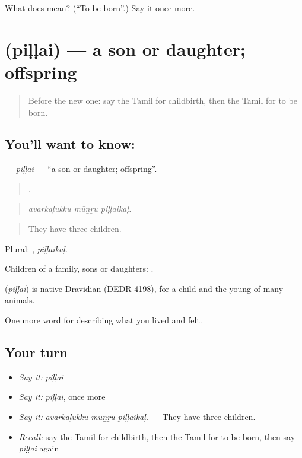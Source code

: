 \begin{tcolorbox}[breakable,colback=teal!4,colframe=teal!35!black,title={Before you move on}]
What does  mean? (\textquotedblleft{}To be born\textquotedblright{}.) Say it once more.
\end{tcolorbox}
\section[\texorpdfstring{\ta{பிள்ளை} (piḷḷai)}{பிள்ளை (piḷḷai)}]{ (piḷḷai) — a son or daughter; offspring}

\label{lesson:TA-C496-pillai}



\begin{quote}
Before the new one: say the Tamil for childbirth, then the Tamil for to be born.
\end{quote}

\subsection*{You'll want to know: }
\textbf{} — \emph{piḷḷai} — \textquotedblleft{}a son or daughter; offspring\textquotedblright{}.

\begin{quote}
  .
\end{quote}

\begin{quote}
\emph{avarkaḷukku mūṉṟu piḷḷaikaḷ.}
\end{quote}

\begin{quote}
They have three children.
\end{quote}

Plural: , \emph{piḷḷaikaḷ}.

Children of a family, sons or daughters: .

\begin{cousinweb}
\textbf{} (\emph{piḷḷai}) is native Dravidian (DEDR 4198), for a child and the young of many animals.
\end{cousinweb}

\begin{grammarlens}[title={What you've built}]
One more word for describing what you lived and felt.
\end{grammarlens}

\subsection*{Your turn}
\begin{itemize}
\raggedright
  \item \emph{Say it:} \emph{piḷḷai}
  \item \emph{Say it:} \emph{piḷḷai}, once more
  \item \emph{Say it:} \emph{avarkaḷukku mūṉṟu piḷḷaikaḷ.} — They have three children.
  \item \emph{Recall:} say the Tamil for childbirth, then the Tamil for to be born, then say \emph{piḷḷai} again
\end{itemize}

